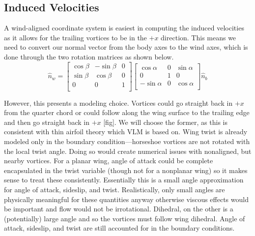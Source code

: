 \documentclass{article}
\begin{document}
\subsection{Induced Velocities}

A wind-aligned coordinate system is easiest in computing the induced velocities as it allows for the trailing vortices to be in the $+x$ direction.  This means we need to convert our normal vector from the body axes to the wind axes, which is done through the two rotation matrices as shown below.
\begin{equation}
\hat{n}_w = 
\begin{bmatrix}
\cos\beta & -\sin\beta & 0 \\
\sin\beta & \cos\beta & 0 \\
0 & 0 & 1\\
\end{bmatrix}
\begin{bmatrix}
\cos\alpha & 0 & \sin\alpha \\
0 & 1 & 0\\
-\sin\alpha & 0 & \cos\alpha \\
\end{bmatrix}
\hat{n}_b
\end{equation}

However, this presents a modeling choice.  Vortices could go straight back in $+x$ from the quarter chord or could follow along the wing surface to the trailing edge and then go straight back in $+x$ [fig].  We will choose the former, as this is consistent with thin airfoil theory which VLM is based on.  Wing twist is already modeled only in the boundary condition---horseshoe vortices are not rotated with the local twist angle.  Doing so would create numerical issues with nonaligned, but nearby vortices.  For a planar wing, angle of attack could be complete encapsulated in the twist variable (though not for a nonplanar wing) so it makes sense to treat these consistently. Essentially this is a small angle approximation for angle of attack, sideslip, and twist.  Realistically, only small angles are physically meaningful for these quantities anyway otherwise viscous effects would be important and flow would not be irrotational.  Dihedral, on the other is a (potentially) large angle and so the vortices must follow wing dihedral. Angle of attack, sideslip, and twist are still accounted for in the boundary conditions.
\end{document}
